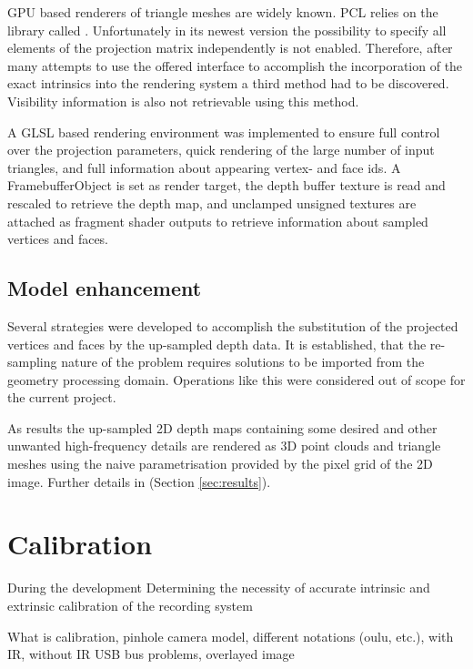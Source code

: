 \documentclass{ucl_thesis}
\newcommand{\secref}[1]{(Section \ref{#1})}
\begin{document}
\par GPU based renderers of triangle meshes are widely known. PCL relies on the library called \citep{vtk}. Unfortunately in its newest version the possibility to specify all elements of the projection matrix independently is not enabled. Therefore, after many attempts to use the offered interface to accomplish the incorporation of the exact intrinsics into the rendering system a third method had to be discovered. Visibility information is also not retrievable using this method.
\par A GLSL based rendering environment was implemented to ensure full control over the projection parameters, quick rendering of the large number of input triangles, and full information about appearing vertex- and face ids. A FramebufferObject is set as render target, the depth buffer texture is read and rescaled to retrieve the depth map, and unclamped unsigned textures are attached as fragment shader outputs to retrieve information about sampled vertices and faces.

\subsection{Model enhancement}
\par Several strategies were developed to accomplish the substitution of the projected vertices and faces by the up-sampled depth data. It is established, that the re-sampling nature of the problem requires solutions to be imported from the geometry processing domain. Operations like this were considered out of scope for the current project.

\par As results the up-sampled 2D depth maps containing some desired and other unwanted high-frequency details are rendered as 3D point clouds and triangle meshes using the naive parametrisation provided by the pixel grid of the 2D image. Further details in \secref{sec:results}.

\section{Calibration}
\label{sec:calibration}
During the development Determining the necessity of accurate intrinsic and extrinsic calibration of the recording system

What is calibration, pinhole camera model, different notations (oulu, etc.), 
with IR, without IR
USB bus problems, overlayed image
\end{document}
